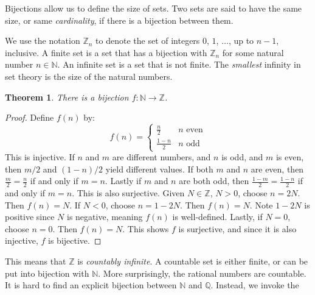\documentclass{article}
\theoremstyle{plain}
\newtheorem{theorem}{Theorem}[section]
\theoremstyle{normal}
\newenvironment{notation}{%
    \pushQED{\qed}\renewcommand{\qedsymbol}{$\blacksquare$}\notationx%
}{%
    \popQED\endnotationx%
}
\begin{document}
        Bijections allow us to define the size of sets. Two sets are said to
        have the same size, or same \textit{cardinality}, if there is a
        bijection between them.
        \begin{notation}
            We use the notation $\mathbb{Z}_{n}$ to denote the set of integers
            $0$, $1$, $\dots$, up to $n-1$, inclusive.
        \end{notation}
        A finite set is a set that has a bijection with $\mathbb{Z}_{n}$ for
        some natural number $n\in\mathbb{N}$. An infinite set is a set that is
        not finite. The \textit{smallest} infinity in set theory is the size
        of the natural numbers.
        \begin{theorem}
            There is a bijection $f:\mathbb{N}\rightarrow\mathbb{Z}$.
        \end{theorem}
        \begin{proof}
            Define $f(n)$ by:
            \begin{equation}
                f(n)=
                \begin{cases}
                    \frac{n}{2}&n\textrm{ even}\\
                    \frac{1-n}{2}&n\textrm{ odd}
                \end{cases}
            \end{equation}
            This is injective. If $n$ and $m$ are different numbers, and
            $n$ is odd, and $m$ is even, then $m/2$ and $(1-n)/2$ yield
            different values. If both $m$ and $n$ are even,
            then $\frac{m}{2}=\frac{n}{2}$ if and only if $m=n$. Lastly if
            $m$ and $n$ are both odd, then
            $\frac{1-m}{2}=\frac{1-n}{2}$ if and only if $m=n$. This is
            also surjective. Given $N\in\mathbb{Z}$, $N>0$, choose
            $n=2N$. Then $f(n)=N$. If $N<0$, choose
            $n=1-2N$. Then $f(n)=N$. Note $1-2N$ is positive since $N$ is
            negative, meaning $f(n)$ is well-defined. Lastly, if $N=0$,
            choose $n=0$. Then $f(n)=N$. This shows
            $f$ is surjective, and since it is also injective, $f$ is bijective.
        \end{proof}
        This means that $\mathbb{Z}$ is \textit{countably infinite}. A
        countable set is either finite, or can be put into bijection with
        $\mathbb{N}$. More surprisingly, the rational numbers are countable.
        It is hard to find an explicit bijection between $\mathbb{N}$ and
        $\mathbb{Q}$. Instead, we invoke the
\end{document}
